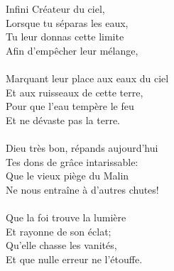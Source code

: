 Infini Créateur du ciel,\\
Lorsque tu séparas les eaux,\\
Tu leur donnas cette limite\\
Afin d’empêcher leur mélange,\\
\\
Marquant leur place aux eaux du ciel\\
Et aux ruisseaux de cette terre,\\
Pour que l’eau tempère le feu\\
Et ne dévaste pas la terre.\\
\\
Dieu très bon, répands aujourd’hui\\
Tes dons de grâce intarissable:\\
Que le vieux piège du Malin\\
Ne nous entraîne à d’autres chutes!\\
\\
Que la foi trouve la lumière\\
Et rayonne de son éclat;\\
Qu’elle chasse les vanités,\\
Et que nulle erreur ne l’étouffe.